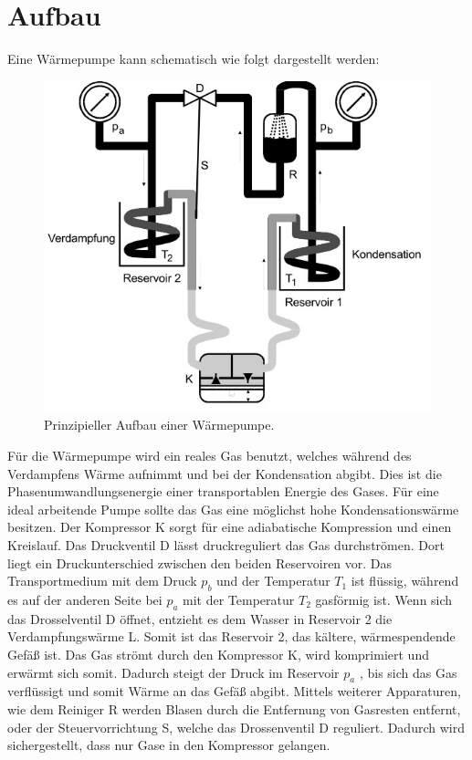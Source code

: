\section{Aufbau}
\label{sec:Aufbau}
Eine Wärmepumpe kann schematisch wie folgt dargestellt werden:
\begin{figure}
  \centering
  \includegraphics{data/Abb1.jpg}
  \caption{Prinzipieller Aufbau einer Wärmepumpe. \cite{AnleitungV206}}
  \label{fig:Abb1}
\end{figure}
Für die Wärmepumpe wird ein reales Gas benutzt, welches während des Verdampfens Wärme aufnimmt und bei der Kondensation abgibt.
Dies ist die Phasenumwandlungsenergie einer transportablen Energie des Gases.
Für eine ideal arbeitende Pumpe sollte das Gas eine möglichst hohe Kondensationswärme besitzen.
Der Kompressor K sorgt für eine adiabatische Kompression und einen Kreislauf.
Das Druckventil D lässt druckreguliert das Gas durchströmen.
Dort liegt ein Druckunterschied zwischen den beiden Reservoiren vor.
Das Transportmedium mit dem Druck $p_b$ und der Temperatur $T_1$ ist flüssig,
während es auf der anderen Seite bei $p_a$ mit der Temperatur $T_2$ gasförmig ist.
Wenn sich das Drosselventil D öffnet, entzieht es dem Wasser in Reservoir 2 die Verdampfungswärme L.
Somit ist das Reservoir 2, das kältere, wärmespendende Gefäß ist.
Das Gas strömt durch den Kompressor K, wird komprimiert und erwärmt sich somit.
Dadurch steigt der Druck im Reservoir $p_a$ , bis sich das Gas verflüssigt und somit Wärme an das Gefäß abgibt.
Mittels weiterer Apparaturen, wie dem Reiniger R werden Blasen durch die Entfernung von Gasresten entfernt,
oder der Steuervorrichtung S, welche das Drossenventil D reguliert.
Dadurch wird sichergestellt, dass nur Gase in den Kompressor gelangen.
